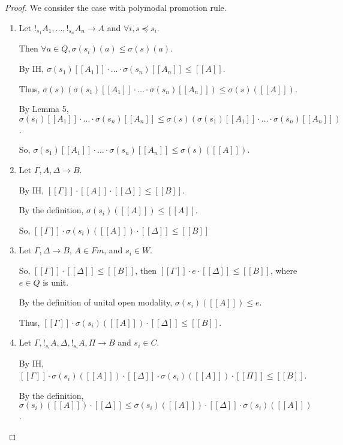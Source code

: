 \documentclass[a4paper]{article}
\begin{document}
\begin{proof}
We consider the case with polymodal promotion rule.

\begin{enumerate}

\item Let $!_{s_1} A_1, \dots, !_{s_n} A_n \rightarrow A$ and $\forall i, s \preceq s_i$.

Then $\forall a \in Q, \sigma(s_i)(a) \leq \sigma(s)(a)$.

By IH, $\sigma(s_1)[\![A_1]\!] \cdot \dots \cdot \sigma(s_n) [\![A_n]\!] \leq [\![A]\!]$.

Thus, $\sigma(s)(\sigma(s_1)[\![A_1]\!] \cdot \dots \cdot \sigma(s_n) [\![A_n]\!]) \leq \sigma(s)([\![A]\!])$.

By Lemma 5, $\sigma(s_1)[\![A_1]\!] \cdot \dots \cdot \sigma(s_n) [\![A_n]\!] \leq \sigma(s)(\sigma(s_1)[\![A_1]\!] \cdot \dots \cdot \sigma(s_n) [\![A_n]\!])$.

So, $\sigma(s_1)[\![A_1]\!] \cdot \dots \cdot \sigma(s_n) [\![A_n]\!] \leq \sigma(s)([\![A]\!])$.

\item Let $\Gamma, A, \Delta \rightarrow B$.

By IH, $[\![\Gamma]\!] \cdot [\![A]\!] \cdot [\![\Delta]\!] \leq [\![B]\!]$.

By the definition, $\sigma(s_i)([\![A]\!]) \leq [\![A]\!]$.

So, $[\![\Gamma]\!] \cdot \sigma(s_i)([\![A]\!]) \cdot [\![\Delta]\!] \leq [\![B]\!]$

\item Let $\Gamma, \Delta \rightarrow B$, $A \in Fm$, and $s_i \in W$.

So, $[\![\Gamma]\!] \cdot [\![\Delta]\!] \leq [\![B]\!]$,
then $[\![\Gamma]\!] \cdot e \cdot [\![\Delta]\!] \leq [\![B]\!]$, where $e \in Q$ is unit.

By the definition of unital open modality, $\sigma(s_i)([\![A]\!]) \leq e$.

Thus, $[\![\Gamma]\!] \cdot \sigma(s_i)([\![A]\!]) \cdot [\![\Delta]\!] \leq [\![B]\!]$.

\item Let $\Gamma, !_{s_i} A, \Delta, !_{s_i} A, \Pi \rightarrow B$ and $s_i \in C$.

By IH, $[\![\Gamma]\!] \cdot \sigma(s_i)([\![A]\!]) \cdot [\![\Delta]\!] \cdot \sigma(s_i)([\![A]\!]) \cdot [\![\Pi]\!] \leq [\![B]\!]$.

By the definition, $\sigma(s_i)([\![A]\!]) \cdot [\![\Delta]\!] \leq \sigma(s_i)([\![A]\!]) \cdot [\![\Delta]\!] \cdot \sigma(s_i)([\![A]\!])$.


\end{enumerate}
\end{proof}
\end{document}
